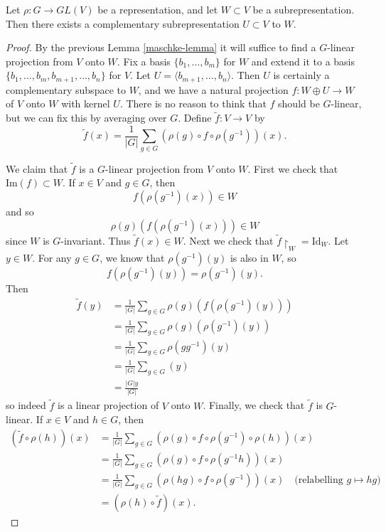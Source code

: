 \begin{thm}
Let $\rho \colon G \to GL(V)$ be a representation, and let $W \subset V$ be a subrepresentation.  Then there exists a complementary subrepresentation $U \subset V$ to $W$.
\end{thm}
\begin{proof}
By the previous Lemma \ref{maschke-lemma} it will suffice to find a $G$-linear projection from $V$ onto $W$.  Fix a basis $\{ b_1, \ldots, b_m \}$ for $W$ and extend it to a basis  $\{ b_1, \ldots, b_m, b_{m+1}, \ldots, b_n \}$ for $V$.  Let $U = \langle b_{m+1}, \ldots, b_n \rangle$.  Then $U$ is certainly a complementary subspace to $W$, and we have a natural projection $f \colon W \oplus U \to W$ of $V$ onto $W$ with kernel $U$.  There is no reason to think that $f$ should be $G$-linear, but we can fix this by averaging over $G$.  Define $\tilde{f} \colon V \to V$ by
\[\tilde{f}(x) = \frac{1}{|G|} \sum_{g \in G} (\rho(g) \circ f \circ \rho(g^{-1}))(x). \]

We claim that $\tilde{f}$ is a $G$-linear projection from $V$ onto $W$.  
First we check that $\text{Im}(f) \subset W$.  If $x \in V$ and $g \in G$, then
\[ f (\rho (g^{-1})(x)) \in W \]
and so
\[ \rho(g) ( f ( \rho( g^{-1})(x))) \in W \]
since $W$ is $G$-invariant.  Thus $\tilde{f}(x) \in W$.  Next we check that $\tilde{f} \restriction_{W} = \text{Id}_W$. Let $y \in W$.  For any $g \in G$, we know that $\rho(g^{-1})(y)$ is also in $W$, so
\[ f (\rho(g^{-1})(y)) = \rho (g^{-1})(y).\]
Then
\begin{align*}
\tilde{f}(y) &=  \frac{1}{|G|} \sum_{g \in G} \rho(g) (f ( \rho(g^{-1})(y))) \\
&=\frac{1}{|G|} \sum_{g \in G} \rho(g) (\rho(g^{-1})(y)) \\
&= \frac{1}{|G|} \sum_{g \in G} \rho(g g^{-1}) (y) \\
&=\frac{1}{|G|} \sum_{g \in G} (y) \\
&= \frac{|G| y} {|G|}
\end{align*}
so indeed $\tilde{f}$ is a linear projection of $V$ onto $W$.  Finally, we check that $\tilde{f}$ is $G$-linear.  If $x \in V$ and $h \in G$, then
\begin{align*}
(\tilde{f} \circ \rho(h))(x) &= \frac{1}{|G|} \sum_{g \in G} (\rho(g) \circ f \circ \rho(g^{-1}) \circ \rho(h))(x) \\
&= \frac{1}{|G|} \sum_{g \in G} (\rho(g) \circ f \circ \rho(g^{-1} h))(x) \\
&=\frac{1}{|G|} \sum_{g \in G} (\rho(hg) \circ f \circ \rho(g^{-1}))(x) \quad \text{(relabelling } g \mapsto hg \text{)} \\
&= (\rho(h) \circ \tilde{f}) (x).
\end{align*}
\end{proof}


